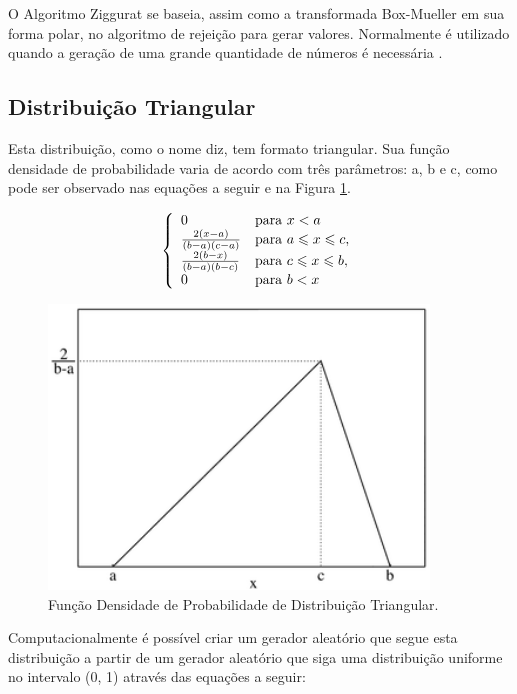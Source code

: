 O Algoritmo Ziggurat se baseia, assim como a transformada Box-Mueller em sua forma polar, no algoritmo de rejeição para gerar valores. Normalmente é utilizado quando a geração de uma grande quantidade de números é necessária \cite{ziggurat}. 

\subsection{Distribuição Triangular}

Esta distribuição, como o nome diz, tem formato triangular. Sua função densidade de probabilidade varia de acordo com três parâmetros: a, b e c, como pode ser observado nas equações a seguir e na Figura \ref{fig:triangulardist}.

\[\left\{\begin{array}{l l}
0 & \mbox{para } x < a \\ 
\frac{2(x-a)}{(b-a)(c-a)} & \mbox{para } a \leqslant x \leqslant c, \\
\frac{2(b-x)}{(b-a)(b-c)} & \mbox{para } c \leqslant x \leqslant b, \\
0 & \mbox{para } b < x
\end{array}\right.\]

\begin{figure}[!htb]
	\centering
	\includegraphics[width=0.9\textwidth]{./imgs/triangulardist.png}
	\caption{Função Densidade de Probabilidade de Distribuição Triangular.}
	\label{fig:triangulardist}
\end{figure}

Computacionalmente é possível criar um gerador aleatório que segue esta distribuição a partir de um gerador aleatório que siga uma distribuição uniforme no intervalo (0, 1) através das equações a seguir:

